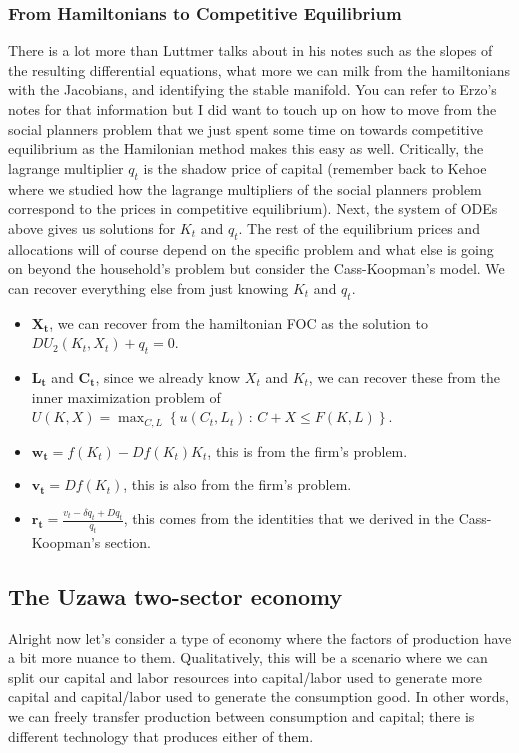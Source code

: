 \documentclass[11pt,english]{article}
\begin{document}
\subsubsection{From Hamiltonians to Competitive Equilibrium}
There is a lot more than Luttmer talks about in his notes such as the slopes of the resulting differential equations, what more we can milk from the hamiltonians with the Jacobians, and identifying the stable manifold. You can refer to Erzo's notes for that information but I did want to touch up on how to move from the social planners problem that we just spent some time on towards competitive equilibrium as the Hamilonian method makes this easy as well. Critically, the lagrange multiplier $q_t$ is the shadow price of capital (remember back to Kehoe where we studied how the lagrange multipliers of the social planners problem correspond to the prices in competitive equilibrium). Next, the system of ODEs above gives us solutions for $K_t$ and $q_t$. The rest of the equilibrium prices and allocations will of course depend on the specific problem and what else is going on beyond the household's problem but consider the Cass-Koopman's model. We can recover everything else from just knowing $K_t$ and $q_t$.
\begin{itemize}
\item $\mathbf{X_t}$, we can recover from the hamiltonian FOC as the solution to $DU_2(K_t, X_t) + q_t = 0$.
\item $\mathbf{L_t}$ and $\mathbf{C_t}$, since we already know $X_t$ and $K_t$, we can recover these from the inner maximization problem of $U(K, X) = \max_{C,L}\left\{u(C_t, L_t)\,:\,C + X\leq F(K, L)\right\}$.
\item $\mathbf{w_t} = f(K_t) - Df(K_t)K_t$, this is from the firm's problem.
\item $\mathbf{v_t} = Df(K_t)$, this is also from the firm's problem.
\item $\mathbf{r_t} = \frac{v_t - \delta q_t + Dq_t}{q_t}$, this comes from the identities that we derived in the Cass-Koopman's section.
\end{itemize}

\subsection{The Uzawa two-sector economy}
Alright now let's consider a type of economy where the factors of production have a bit more nuance to them. Qualitatively, this will be a scenario where we can split our capital and labor resources into capital/labor used to generate more capital and capital/labor used to generate the consumption good. In other words, we can freely transfer production between consumption and capital; there is different technology that produces either of them.
\end{document}
